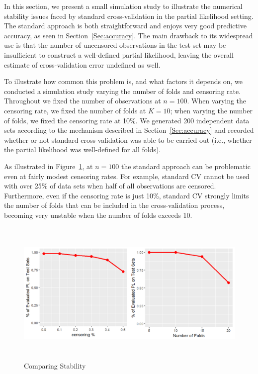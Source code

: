\par In this section, we present a small simulation study to illustrate the numerical stability issues faced by standard cross-validation in the partial likelihood setting.  The standard approach is both straightforward and enjoys very good predictive accuracy, as seen in Section~\ref{Sec:accuracy}. The main drawback to its widespread use is that the number of uncensored observations in the test set may be insufficient to construct a well-defined partial likelihood, leaving the overall estimate of cross-validation error undefined as well.

To illustrate how common this problem is, and what factors it depends on, we conducted a simulation study varying the number of folds and censoring rate. Throughout we fixed the number of observations at $n = 100$. When varying the censoring rate, we fixed the number of folds at $K = 10$; when varying the number of folds, we fixed the censoring rate at 10\%. We generated 200 independent data sets according to the mechanism described in Section~\ref{Sec:accuracy} and recorded whether or not standard cross-validation was able to be carried out (i.e., whether the partial likelihood was well-defined for all folds).



\par As illustrated in Figure~\ref{Fig:stability}, at $n=100$ the standard approach can be problematic even at fairly modest censoring rates.  For example, standard CV cannot be used with over 25\% of data sets when half of all observations are censored.  Furthermore, even if the censoring rate is just 10\%, standard CV strongly limits the number of folds that can be included in the cross-validation process, becoming very unstable when the number of folds exceeds 10.

\begin{figure}[h]
  \centering
  \includegraphics[height= 7cm ]{./figures/figure_3_new.png}
  \caption{\label{Fig:stability}Comparing Stability }
\end{figure}	

